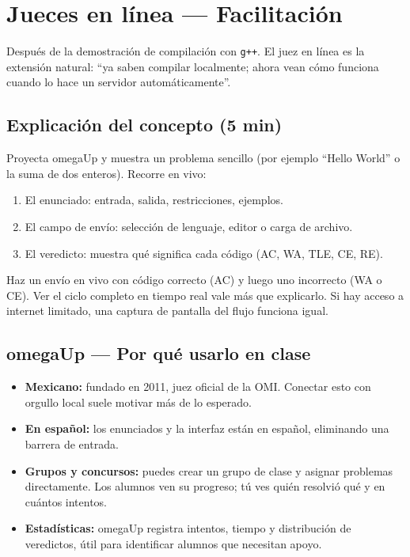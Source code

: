 \documentclass[12pt, oneside]{article}
\begin{document}
\section{Jueces en línea — Facilitación}

\begin{notaprofesor}
  Después de la demostración de compilación con \texttt{g++}. El juez en línea
  es la extensión natural: ``ya saben compilar localmente; ahora vean cómo
  funciona cuando lo hace un servidor automáticamente''.
\end{notaprofesor}

\subsection{Explicación del concepto (5 min)}

Proyecta omegaUp y muestra un problema sencillo (por ejemplo ``Hello World''
o la suma de dos enteros). Recorre en vivo:

\begin{enumerate}
  \item El enunciado: entrada, salida, restricciones, ejemplos.
  \item El campo de envío: selección de lenguaje, editor o carga de archivo.
  \item El veredicto: muestra qué significa cada código (AC, WA, TLE, CE, RE).
\end{enumerate}

\begin{notaprofesor}
  Haz un envío en vivo con código correcto (AC) y luego uno incorrecto (WA
  o CE). Ver el ciclo completo en tiempo real vale más que explicarlo.
  Si hay acceso a internet limitado, una captura de pantalla del flujo
  funciona igual.
\end{notaprofesor}

\subsection{omegaUp — Por qué usarlo en clase}

\begin{itemize}
  \item \textbf{Mexicano:} fundado en 2011, juez oficial de la OMI. Conectar
        esto con orgullo local suele motivar más de lo esperado.
  \item \textbf{En español:} los enunciados y la interfaz están en español,
        eliminando una barrera de entrada.
  \item \textbf{Grupos y concursos:} puedes crear un grupo de clase y asignar
        problemas directamente. Los alumnos ven su progreso; tú ves quién
        resolvió qué y en cuántos intentos.
  \item \textbf{Estadísticas:} omegaUp registra intentos, tiempo y distribución
        de veredictos, útil para identificar alumnos que necesitan apoyo.
\end{itemize}
\end{document}
